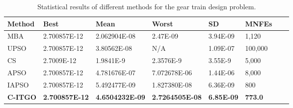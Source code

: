 
\begin{table*}[tp]
    \tiny
\begin{center}

\begin{tabular}{ P{2.0cm} P{2.0cm} P{2.0cm} P{2.0cm} P{2.0cm} P{2.0cm} P{2.0cm} P{2.0cm}  }
\hline
\textbf{Method} & \textbf{Best} & \textbf{Mean} & \textbf{Worst} & \textbf{SD} & \textbf{MNFEs} \\
\hline

MBA & 2.700857E-12 & 2.062904E-08 & 2.47E-09 & 3.94E-09 & 1,120 \\
UPSO & 2.700857E-12 & 3.80562E-08 & N/A & 1.09E-07 & 100,000 \\
CS & 2.7009E-12 & 1.9841E-9 & 2.3576E-9 & 3.55E-9 & 5,000 \\
APSO & 2.700857E-12 & 4.781676E-07 & 7.072678E-06 & 1.44E-06 & 8,000 \\
IAPSO & 2.700857E-12 & 5.492477E-09 & 1.827380E-08 & 6.36E-09 & 800 \\
\textbf{C-ITGO} & \bf{2.700857E-12} & \bf{4.6504232E-09} & \bf{2.7264505E-08} & \bf{6.85E-09} & \bf{773.0} \\


\hline
\end{tabular}
\end{center}
\vspace*{-6mm}
\caption{Statistical results of different methods for the gear train design problem. \\[1em]}
\label{tab:GT}
\end{table*}

